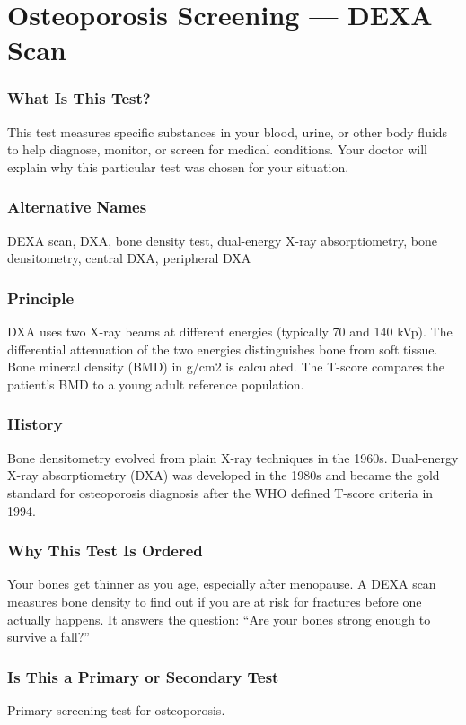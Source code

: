 \section{Osteoporosis Screening --- DEXA Scan}


\subsubsection*{What Is This Test?}
This test measures specific substances in your blood, urine, or other body fluids to help diagnose, monitor, or screen for medical conditions. Your doctor will explain why this particular test was chosen for your situation.

\subsubsection*{Alternative Names}
DEXA scan, DXA, bone density test, dual-energy X-ray absorptiometry, bone densitometry, central DXA, peripheral DXA


\subsubsection*{Principle}
DXA uses two X-ray beams at different energies (typically 70 and 140 kVp). The differential attenuation of the two energies distinguishes bone from soft tissue. Bone mineral density (BMD) in g/cm2 is calculated. The T-score compares the patient's BMD to a young adult reference population.

\subsubsection*{History}
Bone densitometry evolved from plain X-ray techniques in the 1960s. Dual-energy X-ray absorptiometry (DXA) was developed in the 1980s and became the gold standard for osteoporosis diagnosis after the WHO defined T-score criteria in 1994.

\subsubsection*{Why This Test Is Ordered}
Your bones get thinner as you age, especially after menopause. A DEXA scan measures bone density to find out if you are at risk for fractures before one actually happens. It answers the question: ``Are your bones strong enough to survive a fall?''

\subsubsection*{Is This a Primary or Secondary Test}
Primary screening test for osteoporosis.

